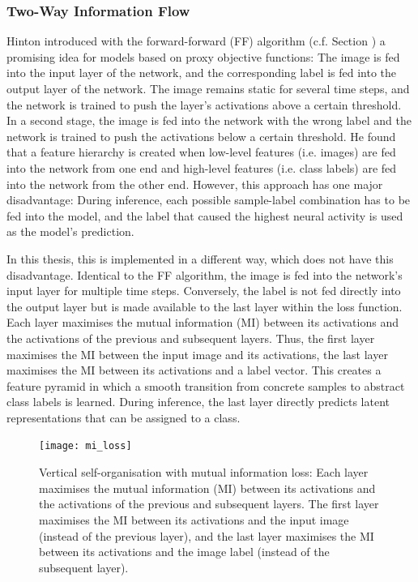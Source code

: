 \subsubsection{Two-Way Information Flow}
Hinton  introduced with the forward-forward (FF) algorithm (c.f. Section ) a promising idea for models based on proxy objective functions: 
The image is fed into the input layer of the network, and the corresponding label is fed into the output layer of the network. The image remains static for several time steps, and the network is trained to push the layer's activations above a certain threshold. In a second stage, the image is fed into the network with the wrong label and the network is trained to push the activations below a certain threshold. He found that a feature hierarchy is created when low-level features (i.e. images) are fed into the network from one end and high-level features (i.e. class labels) are fed into the network from the other end. However, this approach has one major disadvantage: During inference, each possible sample-label combination has to be fed into the model, and the label that caused the highest neural activity is used as the model's prediction.

In this thesis, this is implemented in a different way, which does not have this disadvantage. Identical to the FF algorithm, the image is fed into the network's input layer for multiple time steps. Conversely, the label is not fed directly into the output layer but is made available to the last layer within the loss function. Each layer maximises the mutual information (MI) between its activations and the activations of the previous and subsequent layers. Thus, the first layer maximises the MI between the input image and its activations, the last layer maximises the MI between its activations and a label vector. This creates a feature pyramid in which a smooth transition from concrete samples to abstract class labels is learned. During inference, the last layer directly predicts latent representations that can be assigned to a class.

\begin{figure}[h]
    \centering
    \texttt{[image: mi\_loss]}
    \caption[Vertical self-organisation with mutual information loss]{Vertical self-organisation with mutual information loss: Each layer maximises the mutual information (MI) between its activations and the activations of the previous and subsequent layers. The first layer maximises the MI between its activations and the input image (instead of the previous layer), and the last layer maximises the MI between its activations and the image label (instead of the subsequent layer).}
\end{figure}


